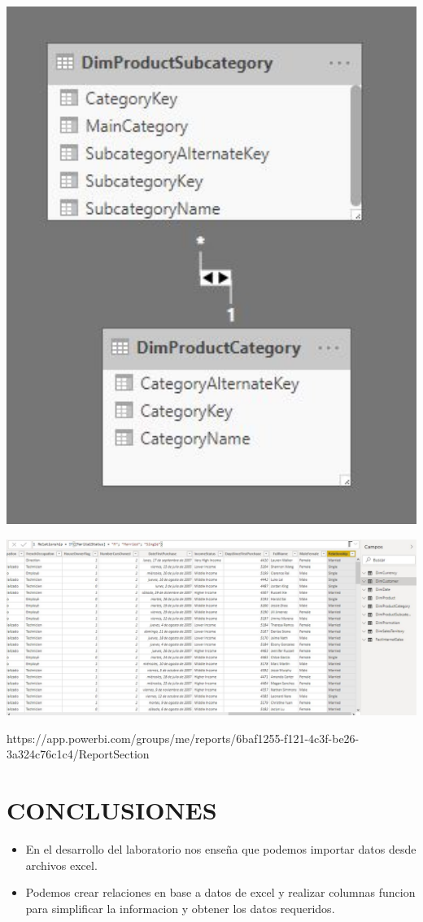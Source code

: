 \documentclass[12pt,letterpaper]{article}
\begin{document}
	\begin{center}
	\includegraphics[width=16cm]{./Imagenes/img3}
	\end{center}
	\begin{center}
	\includegraphics[width=16cm]{./Imagenes/img4}
	\end{center}
\par https://app.powerbi.com/groups/me/reports/6baf1255-f121-4c3f-be26-3a324c76c1c4/ReportSection
\section{CONCLUSIONES}
\begin{itemize}
	\item En el desarrollo del laboratorio nos enseña que podemos importar datos desde archivos excel.
	\item Podemos crear relaciones en base a datos de excel y realizar columnas funcion para simplificar la informacion y obtener los datos requeridos.
\end{itemize}
\end{document}
